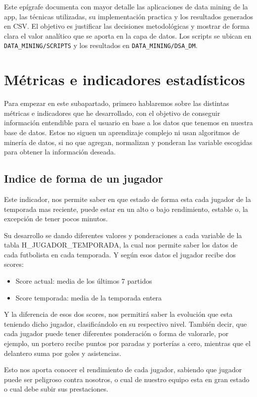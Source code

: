Este epígrafe documenta con mayor detalle las aplicaciones de data mining de la app, las técnicas utilizadas, su implementación practica y los resultados generados en CSV. El objetivo es justificar las decisiones metodológicas y mostrar de forma clara el valor analítico que se aporta en la capa de datos. Los scripts se ubican en \texttt{DATA\_MINING/SCRIPTS} y los resultados en \texttt{DATA\_MINING/DSA\_DM}.

\section{Métricas e indicadores estadísticos}
Para empezar en este subapartado, primero hablaremos sobre las distintas métricas e indicadores que he desarrollado, con el objetivo de conseguir información entendible para el usuario en base a los datos que tenemos en nuestra base de datos. Estos no siguen un aprendizaje complejo ni usan algoritmos de minería de datos, si no que agregan, normalizan y ponderan las variable escogidas para obtener la información deseada.
\subsection{Indice de forma de un jugador}

Este indicador, nos permite saber en que estado de forma esta cada jugador de la temporada mas reciente, puede estar en un alto o bajo rendimiento, estable o, la excepción de tener pocos minutos.

Su desarrollo se dando diferentes valores y ponderaciones a cada variable de la tabla  H\_JUGADOR\_TEMPORADA, la cual nos permite saber los datos de cada futbolista en cada temporada. Y según esos datos el jugador recibe dos scores:
\begin{itemize}
    \item Score actual: media de los últimos 7 partidos
    \item Score temporada: media de la temporada entera
\end{itemize}

Y la diferencia de esos dos scores, nos permitirá saber la evolución que esta teniendo dicho jugador, clasificándolo en su respectivo nivel. También decir, que cada jugador puede tener diferentes ponderación o forma de valorarle, por ejemplo, un portero recibe puntos por paradas y porterías a cero, mientras que el delantero suma por goles y asistencias.

Esto nos aporta conocer el rendimiento de cada jugador, sabiendo que jugador puede ser peligroso contra nosotros, o cual de nuestro equipo esta en gran estado o cual debe subir sus prestaciones.

